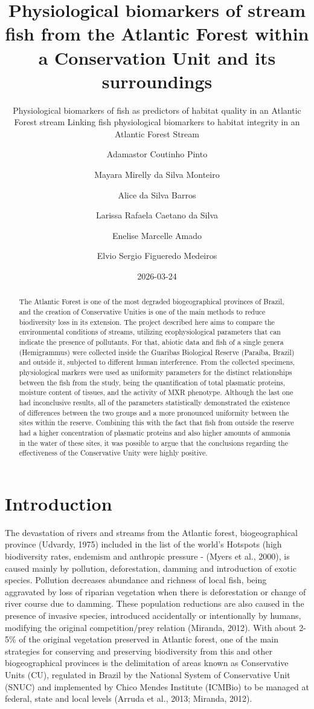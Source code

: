 \documentclass[
  american,
  letterpaper,
  DIV=11,
  numbers=noendperiod]{scrartcl}
\title{Physiological biomarkers of stream fish from the Atlantic Forest
within a Conservation Unit and its surroundings}
\subtitle{Physiological biomarkers of fish as predictors of habitat
quality in an Atlantic Forest stream Linking fish physiological
biomarkers to habitat integrity in an Atlantic Forest Stream}
\author{Adamastor Coutinho Pinto \and Mayara Mirelly da Silva
Monteiro \and Alice da Silva Barros \and Larissa Rafaela Caetano da
Silva \and Enelise Marcelle Amado \and Elvio Sergio Figueredo Medeiros}
\date{2026-03-24}
\renewcommand*\contentsname{Table of contents}
\newcommand\contentsname{Table of contents}
\begin{document}
\maketitle
\begin{abstract}
The Atlantic Forest is one of the most degraded biogeographical
provinces of Brazil, and the creation of Conservative Unities is one of
the main methods to reduce biodiversity loss in its extension. The
project described here aims to compare the environmental conditions of
streams, utilizing ecophysiological parameters that can indicate the
presence of pollutants. For that, abiotic data and fish of a single
genera (Hemigrammus) were collected inside the Guaribas Biological
Reserve (Paraíba, Brazil) and outside it, subjected to different human
interference. From the collected specimens, physiological markers were
used as uniformity parameters for the distinct relationships between the
fish from the study, being the quantification of total plasmatic
proteins, moisture content of tissues, and the activity of MXR
phenotype. Although the last one had inconclusive results, all of the
parameters statistically demonstrated the existence of differences
between the two groups and a more pronounced uniformity between the
sites within the reserve. Combining this with the fact that fish from
outside the reserve had a higher concentration of plasmatic proteins and
also higher amounts of ammonia in the water of these sites, it was
possible to argue that the conclusions regarding the effectiveness of
the Conservative Unity were highly positive.
\end{abstract}

\renewcommand*\contentsname{Table of contents}
{
\hypersetup{linkcolor=}
\setcounter{tocdepth}{3}
\tableofcontents
}
\listoffigures
\listoftables

\section{Introduction}\label{introduction}

The devastation of rivers and streams from the Atlantic forest,
biogeographical province (Udvardy, 1975) included in the list of the
world's Hotspots (high biodiversity rates, endemism and anthropic
pressure - (Myers et al., 2000), is caused mainly by pollution,
deforestation, damming and introduction of exotic species. Pollution
decreases abundance and richness of local fish, being aggravated by loss
of riparian vegetation when there is deforestation or change of river
course due to damming. These population reductions are also caused in
the presence of invasive species, introduced accidentally or
intentionally by humans, modifying the original competition/prey
relation (Miranda, 2012). With about 2-5\% of the original vegetation
preserved in Atlantic forest, one of the main strategies for conserving
and preserving biodiversity from this and other biogeographical
provinces is the delimitation of areas known as Conservative Units (CU),
regulated in Brazil by the National System of Conservative Unit (SNUC)
and implemented by Chico Mendes Institute (ICMBio) to be managed at
federal, state and local levels (Arruda et al., 2013; Miranda, 2012).
\end{document}
